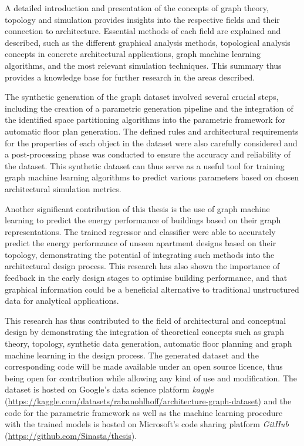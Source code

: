 \documentclass[a4paper, 12pt]{report}
\begin{document}
A detailed introduction and presentation of the concepts of graph theory, topology and simulation provides insights into the respective fields and their connection to architecture. Essential methods of each field are explained and described, such as the different graphical analysis methods, topological analysis concepts in concrete architectural applications, graph machine learning algorithms, and the most relevant simulation techniques. This summary thus provides a knowledge base for further research in the areas described.

The synthetic generation of the graph dataset involved several crucial steps, including the creation of a parametric generation pipeline and the integration of the identified space partitioning algorithms into the parametric framework for automatic floor plan generation. The defined rules and architectural requirements for the properties of each object in the dataset were also carefully considered and a post-processing phase was conducted to ensure the accuracy and reliability of the dataset. This synthetic dataset can thus serve as a useful tool for training graph machine learning algorithms to predict various parameters based on chosen architectural simulation metrics.

Another significant contribution of this thesis is the use of graph machine learning to predict the energy performance of buildings based on their graph representations. The trained regressor and classifier were able to accurately predict the energy performance of unseen apartment designs based on their topology, demonstrating the potential of integrating such methods into the architectural design process. This research has also shown the importance of feedback in the early design stages to optimise building performance, and that graphical information could be a beneficial alternative to traditional unstructured data for analytical applications.

This research has thus contributed to the field of architectural and conceptual design by demonstrating the integration of theoretical concepts such as graph theory, topology, synthetic data generation, automatic floor planning and graph machine learning in the design process. The generated dataset and the corresponding code will be made available under an \gls{open source} licence, thus being open for contribution while allowing any kind of use and modification. The dataset is hosted on Google's data science platform \textit{kaggle} (\url{https://kaggle.com/datasets/rabanohlhoff/architecture-graph-dataset}) and the code for the parametric framework as well as the machine learning procedure with the trained models is hosted on Microsoft's code sharing platform \textit{GitHub} (\url{https://github.com/Sinasta/thesis}).
\end{document}
